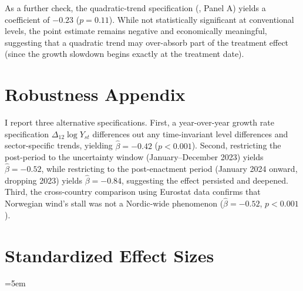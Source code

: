 \documentclass[12pt]{article}
\begin{document}
As a further check, the quadratic-trend specification (, Panel A) yields a coefficient of $-0.23$ ($p = 0.11$). While not statistically significant at conventional levels, the point estimate remains negative and economically meaningful, suggesting that a quadratic trend may over-absorb part of the treatment effect (since the growth slowdown begins exactly at the treatment date).


\section{Robustness Appendix}
\label{sec:app_robust}

I report three alternative specifications. First, a year-over-year growth rate specification $\Delta_{12}\log Y_{st}$ differences out any time-invariant level differences and sector-specific trends, yielding $\hat{\beta} = -0.42$ ($p < 0.001$). Second, restricting the post-period to the uncertainty window (January--December 2023) yields $\hat{\beta} = -0.52$, while restricting to the post-enactment period (January 2024 onward, dropping 2023) yields $\hat{\beta} = -0.84$, suggesting the effect persisted and deepened. Third, the cross-country comparison using Eurostat data confirms that Norwegian wind's stall was not a Nordic-wide phenomenon ($\hat{\beta} = -0.52$, $p < 0.001$).


\section{Standardized Effect Sizes}
\label{sec:sde}

{\hfuzz=20pt\emergencystretch=5em

}
\end{document}
